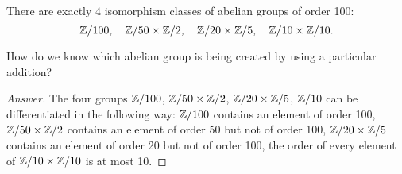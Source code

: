 There are exactly 4 isomorphism classes of abelian groups of order 100:
  \begin{equation*}
    \mathbb{Z}/100,\quad \mathbb{Z}/50 \times \mathbb{Z}/2, \quad \mathbb{Z}/20 \times \mathbb{Z}/5, \quad \mathbb{Z}/10 \times \mathbb{Z}/10.
  \end{equation*}
\begin{q*}
  How do we know which abelian group is being created by using a particular addition?
\end{q*}
\begin{proof}[Answer]
  The four groups $\mathbb{Z}/100$, $\mathbb{Z}/50 \times \mathbb{Z}/2$, $\mathbb{Z}/20 \times \mathbb{Z}/5$, $\mathbb{Z}/10$ can be differentiated in the following way:
  $\mathbb{Z}/100$ contains an element of order 100,
  $\mathbb{Z}/50 \times \mathbb{Z}/2$ contains an element of order 50 but not of order 100,
  $\mathbb{Z}/20 \times \mathbb{Z}/5$ contains an element of order 20 but not of order 100,
  the order of every element of $\mathbb{Z}/10 \times \mathbb{Z}/10$ is at most 10.
\end{proof}
